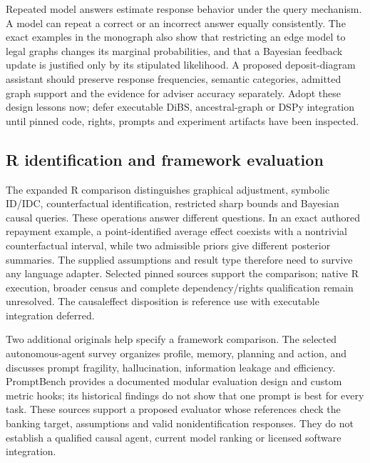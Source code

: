 Repeated model answers estimate response behavior under the query
mechanism. A model can repeat a correct or an incorrect answer equally
consistently. The exact examples in the monograph also show that
restricting an edge model to legal graphs changes its marginal
probabilities, and that a Bayesian feedback update is justified only by
its stipulated likelihood. A proposed deposit-diagram assistant should
preserve response frequencies, semantic categories, admitted graph
support and the evidence for adviser accuracy separately. Adopt these
design lessons now; defer executable DiBS, ancestral-graph or DSPy
integration until pinned code, rights, prompts and experiment artifacts
have been inspected.
\citep{exec18_bayesian_reference,exec18_videira_thesis}

\hypertarget{r-identification-and-framework-evaluation}{%
\subsection{R identification and framework
evaluation}\label{r-identification-and-framework-evaluation}}

The expanded R comparison distinguishes graphical adjustment, symbolic
ID/IDC, counterfactual identification, restricted sharp bounds and
Bayesian causal queries. These operations answer different questions. In
an exact authored repayment example, a point-identified average effect
coexists with a nontrivial counterfactual interval, while two admissible
priors give different posterior summaries. The supplied assumptions and
result type therefore need to survive any language adapter. Selected
pinned sources support the comparison; native R execution, broader
census and complete dependency/rights qualification remain unresolved.
The causaleffect disposition is reference use with executable
integration deferred. \citep{sp18f_r_identification}

Two additional originals help specify a framework comparison. The
selected autonomous-agent survey organizes profile, memory, planning and
action, and discusses prompt fragility, hallucination, information
leakage and efficiency. PromptBench provides a documented modular
evaluation design and custom metric hooks; its historical findings do
not show that one prompt is best for every task. These sources support a
proposed evaluator whose references check the banking target,
assumptions and valid nonidentification responses. They do not establish
a qualified causal agent, current model ranking or licensed software
integration.
\citep{exec18_framework_agents_survey,exec18_framework_promptbench}

